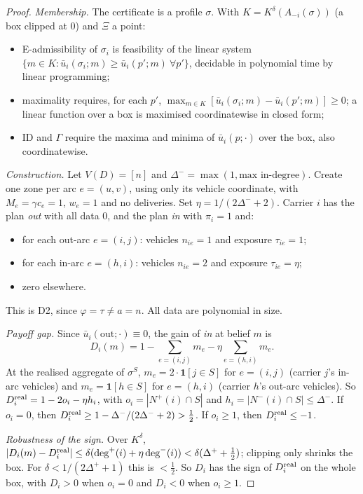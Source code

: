 \documentclass[11pt]{article}
\theoremstyle{definition}
\theoremstyle{remark}
\newcommand{\ub}{\bar u}
\begin{document}
\begin{proof}
\emph{Membership.} The certificate is a profile $\sigma$. With $K=K^\delta(A_{-i}(\sigma))$ (a box clipped at $0$) and $\Xi$ a point:
\begin{itemize}
\item E-admissibility of $\sigma_i$ is feasibility of the linear system $\{m\in K:\ub_i(\sigma_i;m)\ge\ub_i(p';m)\ \forall p'\}$, decidable in polynomial time by linear programming;
\item maximality requires, for each $p'$, $\max_{m\in K}[\ub_i(\sigma_i;m)-\ub_i(p';m)]\ge0$; a linear function over a box is maximised coordinatewise in closed form;
\item ID and $\Gamma$ require the maxima and minima of $\ub_i(p;\cdot)$ over the box, also coordinatewise.
\end{itemize}
\emph{Construction.} Let $V(D)=[n]$ and $\Delta^-=\max(1,\text{max in-degree})$. Create one zone per arc $e=(u,v)$, using only its vehicle coordinate, with $M_e=\gamma c_e=1$, $w_e=1$ and no deliveries. Set $\eta=1/(2\Delta^-+2)$. Carrier $i$ has the plan \emph{out} with all data $0$, and the plan \emph{in} with $\pi_i=1$ and:
\begin{itemize}
\item for each out-arc $e=(i,j)$: vehicles $n_{ie}=1$ and exposure $\tau_{ie}=1$;
\item for each in-arc $e=(h,i)$: vehicles $n_{ie}=2$ and exposure $\tau_{ie}=\eta$;
\item zero elsewhere.
\end{itemize}
This is D2, since $\varphi=\tau\ne a=n$. All data are polynomial in size.

\emph{Payoff gap.} Since $\ub_i(\text{out};\cdot)\equiv0$, the gain of \emph{in} at belief $m$ is
\[D_i(m)=1-\sum_{e=(i,j)}m_e-\eta\sum_{e=(h,i)}m_e.\]
At the realised aggregate of $\sigma^S$, $m_e=2\cdot\mathbf 1[j\in S]$ for $e=(i,j)$ (carrier $j$'s in-arc vehicles) and $m_e=\mathbf 1[h\in S]$ for $e=(h,i)$ (carrier $h$'s out-arc vehicles). So $D_i^{\rm real}=1-2o_i-\eta h_i$, with $o_i=|N^+(i)\cap S|$ and $h_i=|N^-(i)\cap S|\le\Delta^-$. If $o_i=0$, then $D_i^{\rm real}\ge1-\Delta^-/(2\Delta^-+2)>\tfrac12$. If $o_i\ge1$, then $D_i^{\rm real}\le-1$.

\emph{Robustness of the sign.} Over $K^\delta$, $|D_i(m)-D_i^{\rm real}|\le\delta(\deg^+(i)+\eta\deg^-(i))<\delta(\Delta^++\tfrac12)$; clipping only shrinks the box. For $\delta<1/(2\Delta^++1)$ this is $<\tfrac12$. So $D_i$ has the sign of $D_i^{\rm real}$ on the whole box, with $D_i>0$ when $o_i=0$ and $D_i<0$ when $o_i\ge1$.


\end{proof}
\end{document}
